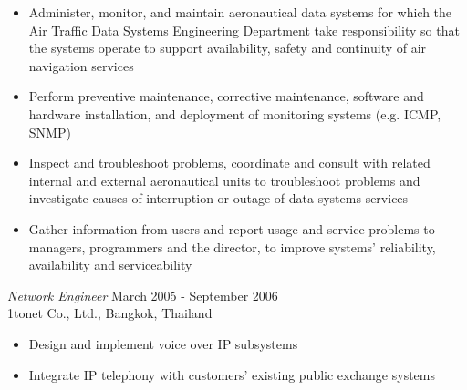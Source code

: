 \documentclass{res}
\begin{document}
\begin{resume}
\begin{itemize} \itemsep -2pt %
   \item Administer, monitor, and maintain aeronautical data systems for which the Air Traffic Data Systems Engineering Department take responsibility so that the systems operate to support availability, safety and continuity of air navigation services
   \item Perform preventive maintenance, corrective maintenance, software and hardware installation, and deployment of monitoring systems (e.g. ICMP, SNMP)
   \item Inspect and troubleshoot problems, coordinate and consult with related internal and external aeronautical units to troubleshoot problems and investigate causes of interruption or outage of data systems services
   \item Gather information from users and report usage and service problems to managers, programmers and the director, to improve systems' reliability, availability and serviceability
 \end{itemize}
 
{\sl Network Engineer} \hfill                  March 2005 - September 2006 \\
1tonet Co., Ltd., Bangkok, Thailand
  \begin{itemize} \itemsep -2pt
  \item Design and implement voice over IP subsystems
 \item  Integrate IP telephony with customers' existing public exchange systems
 \end{itemize}
 \newpage

\end{resume}
\end{document}
